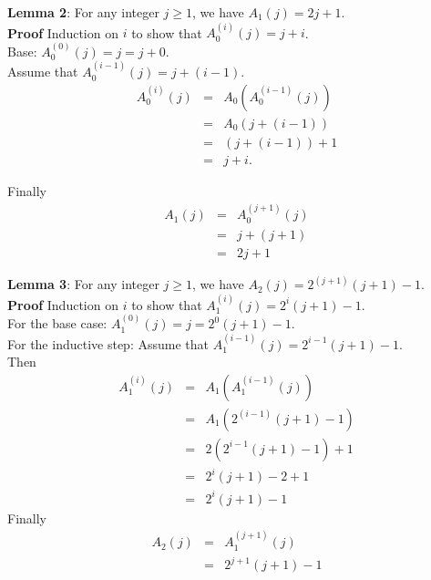 \documentclass{beamer}
\begin{document}
\begin{frame}{}

{\bf Lemma 2}: For any integer $j\ge 1$, we have $A_1(j)=2j+1$. \\
{\bf Proof} Induction on $i$ to show that $A_0^{(i)}(j)=j+i$. \\
Base: $A_0^{(0)}(j)=j=j+0$. \\
Assume that $A_0^{(i-1)}(j)=j+(i-1)$. \\
\begin{eqnarray}
A_0^{(i)}(j) &=& A_0(A_0^{(i-1)}(j))\\
 & = & A_0(j+(i-1)) \\
 & = & (j+(i-1))+1 \\
 & = & j+i.
\end{eqnarray}
\end{frame}

\begin{frame}{}

Finally
\begin{eqnarray} 
A_1(j) &=& A_0^{(j+1)}(j) \\
 &=& j+(j+1) \\
 &=& 2j+1
\end{eqnarray}
\end{frame}

\begin{frame}{}

{\bf Lemma 3}: For any integer $j\ge 1$, we have $A_2(j)=2^{(j+1)}(j+1)-1$. \\
{\bf Proof} Induction on $i$ to show that $A_1^{(i)}(j)=2^i(j+1)-1$. \\
For the base case: $A_1^{(0)}(j)=j=2^0(j+1)-1$. \\
For the inductive step: Assume that $A_1^{(i-1)}(j)=2^{i-1}(j+1)-1$. \\
Then 
\begin{eqnarray*}
A_1^{(i)}(j) &=& A_1(A_1^{(i-1)}(j)) \\
  &=& A_1(2^{(i-1)}(j+1)-1) \\
  &=& 2(2^{i-1}(j+1)-1)+1 \\
  &=& 2^i(j+1)-2+1 \\
  &=& 2^i(j+1) -1
\end{eqnarray*}
Finally 
\begin{eqnarray*}
A_2(j) &=& A_1^{(j+1)}(j) \\
  &=& 2^{j+1}(j+1)-1
\end{eqnarray*}
\end{frame}
\end{document}
